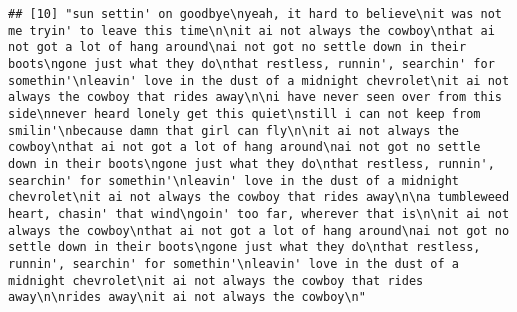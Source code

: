 \documentclass[]{article}
\begin{document}
\begin{verbatim}
## [10] "sun settin' on goodbye\nyeah, it hard to believe\nit was not me tryin' to leave this time\n\nit ai not always the cowboy\nthat ai not got a lot of hang around\nai not got no settle down in their boots\ngone just what they do\nthat restless, runnin', searchin' for somethin'\nleavin' love in the dust of a midnight chevrolet\nit ai not always the cowboy that rides away\n\ni have never seen over from this side\nnever heard lonely get this quiet\nstill i can not keep from smilin'\nbecause damn that girl can fly\n\nit ai not always the cowboy\nthat ai not got a lot of hang around\nai not got no settle down in their boots\ngone just what they do\nthat restless, runnin', searchin' for somethin'\nleavin' love in the dust of a midnight chevrolet\nit ai not always the cowboy that rides away\n\na tumbleweed heart, chasin' that wind\ngoin' too far, wherever that is\n\nit ai not always the cowboy\nthat ai not got a lot of hang around\nai not got no settle down in their boots\ngone just what they do\nthat restless, runnin', searchin' for somethin'\nleavin' love in the dust of a midnight chevrolet\nit ai not always the cowboy that rides away\n\nrides away\nit ai not always the cowboy\n"                                                                                                                                                                                                                                                                                                                                                                                                                                                                                                                                                                                                                                                                                                                                                                                                                                                                                                                                                                                                                                                                                                                                                                                                                                                                                                                                                                                                                                                                                                                                                                                                                                                                                                                                             

\end{verbatim}
\end{document}
